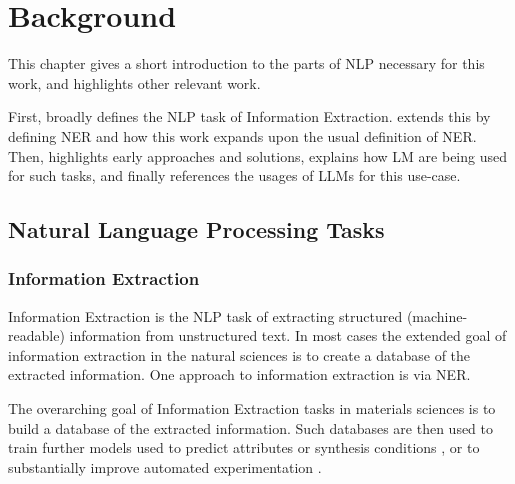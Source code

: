 \chapter{Background}\label{chap:background}

This chapter gives a short introduction to the parts of \acrlong{NLP} necessary for this work, and highlights other relevant work.

First,  broadly defines the \gls{NLP} task of Information Extraction.
 extends this by defining \gls{NER} and how this work expands upon the usual definition of \gls{NER}.
Then,  highlights early approaches and solutions,  explains how \gls{LM} are being used for such tasks, and finally  references the usages of \glspl{LLM} for this use-case.






\section{Natural Language Processing Tasks}\label{sec:NLP}

\subsection{Information Extraction}\label{sub:extraction}
Information Extraction is the \gls{NLP} task of extracting structured (machine-readable) information from unstructured text.
In most cases the extended goal of information extraction in the natural sciences is to create a database of the extracted information.
One approach to information extraction is via \gls{NER}.

The overarching goal of Information Extraction tasks in materials sciences is to build a database of the extracted information.
Such databases are then used to train further models used to predict attributes or synthesis conditions \cite{luo_mof_2022}, or to substantially improve automated experimentation \cite{shi_automated_2021}.

